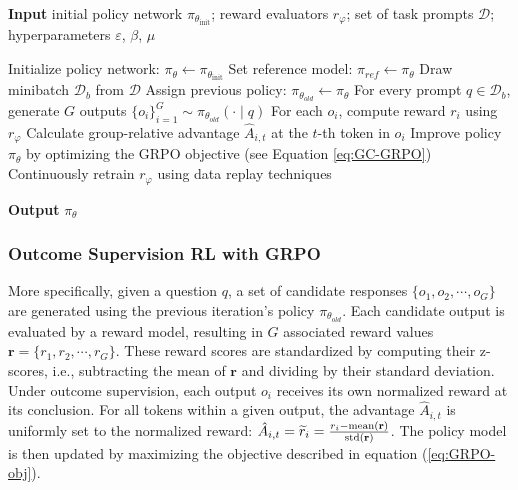 \begin{itemize}[topsep=0pt]
\begin{itemize}[topsep=0pt]
\begin{algorithm}[t]
  \small
  \caption{Iterative Group Relative Policy Optimization}
  \textbf{Input} initial policy network $\pi_{\theta_{\text{init}}}$; reward evaluators $r_\varphi$; set of task prompts $\mathcal{D}$;
  hyperparameters $\varepsilon$, $\beta$, $\mu$
  \begin{algorithmic}[1]
    \State Initialize policy network: $\pi_\theta \leftarrow \pi_{\theta_{\text{init}}}$
       \State Set reference model: $\pi_{ref} \leftarrow \pi_{\theta}$
      \State Draw minibatch $\mathcal{D}_b$ from $\mathcal{D}$
      \State Assign previous policy: $\pi_{\theta_{old}} \leftarrow \pi_{\theta}$
      \State For every prompt $q \in \mathcal{D}_b$, generate $G$ outputs $\{o_i\}_{i=1}^G \sim \pi_{\theta_{old}} (\cdot \mid q) $
      \State For each $o_i$, compute reward $r_i$ using $r_{\varphi}$
      \State Calculate group-relative advantage $\hat{A}_{i,t}$ at the $t$-th token in $o_i$
        \State Improve policy $\pi_{\theta}$ by optimizing the GRPO objective (see Equation \ref{eq:GC-GRPO})
      \EndFor
    \EndFor
    \State Continuously retrain $r_\varphi$ using data replay techniques
    \EndFor
  \end{algorithmic}
  \textbf{Output} $\pi_\theta$
  \label{alg:iter-grpo}
\end{algorithm}

\subsubsection{Outcome Supervision RL with GRPO} More specifically, given a question $q$, a set of candidate responses $\{o_1, o_2, \cdots, o_G\}$ are generated using the previous iteration's policy $\pi_{\theta_{old}}$. Each candidate output is evaluated by a reward model, resulting in $G$ associated reward values $\mathbf{r}=\{r_1, r_2, \cdots, r_G\}$. These reward scores are standardized by computing their z-scores, i.e., subtracting the mean of $\mathbf{r}$ and dividing by their standard deviation. Under outcome supervision, each output $o_i$ receives its own normalized reward at its conclusion. For all tokens within a given output, the advantage $\hat{A}_{i, t}$ is uniformly set to the normalized reward: $\hat{A}_{i, t} = \widetilde{r}_i = \frac{r_i- {\rm mean}(\mathbf{r})}{{\rm std}(\mathbf{r})}$. The policy model is then updated by maximizing the objective described in equation (\ref{eq:GRPO-obj}).


\end{itemize}
\end{itemize}
